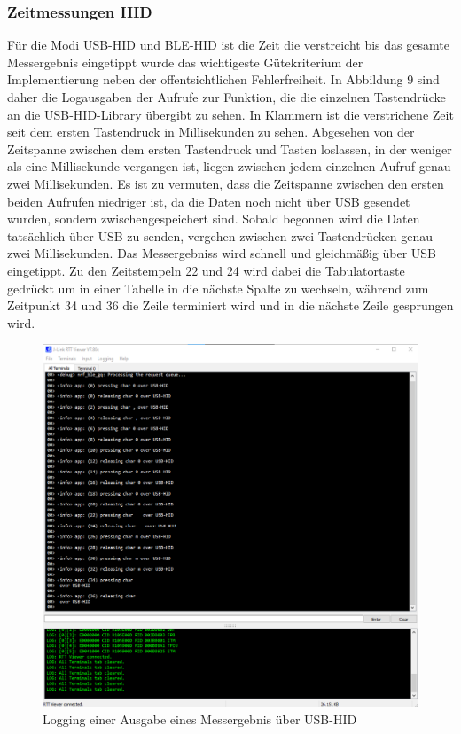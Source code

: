 \subsubsection{Zeitmessungen HID}
Für die Modi USB-HID und BLE-HID ist die Zeit die verstreicht bis das gesamte Messergebnis eingetippt wurde das wichtigeste Gütekriterium der Implementierung neben der offentsichtlichen Fehlerfreiheit. In Abbildung 9 sind daher die Logausgaben der Aufrufe zur Funktion, die die einzelnen Tastendrücke an die USB-HID-Library übergibt zu sehen. In Klammern ist die verstrichene Zeit seit dem ersten Tastendruck in Millisekunden zu sehen. Abgesehen von der Zeitspanne zwischen dem ersten Tastendruck und Tasten loslassen, in der weniger als eine Millisekunde vergangen ist, liegen zwischen jedem einzelnen Aufruf genau zwei Millisekunden. Es ist zu vermuten, dass die Zeitspanne zwischen den ersten beiden Aufrufen niedriger ist, da die Daten noch nicht über USB gesendet wurden, sondern zwischengespeichert sind. Sobald begonnen wird die Daten tatsächlich über USB zu senden, vergehen zwischen zwei Tastendrücken genau zwei Millisekunden. Das Messergebniss wird schnell und gleichmäßig über USB eingetippt. Zu den Zeitstempeln 22 und 24 wird dabei die Tabulatortaste gedrückt um in einer Tabelle in die nächste Spalte zu wechseln, während zum Zeitpunkt 34 und 36 die Zeile terminiert wird und in die nächste Zeile gesprungen wird.
\begin{figure}[H] 
	\centering
	\includegraphics[width=\textwidth]{figures/USBHID.png}
	\caption{Logging einer Ausgabe eines Messergebnis über USB-HID}
\end{figure}

